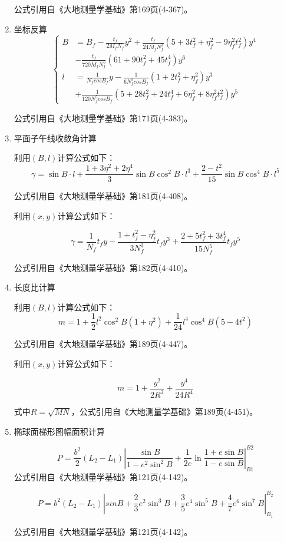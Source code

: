 \begin{enumerate}
公式引用自《大地测量学基础》第169页(4-367)。

\item 坐标反算
\[
\left \{ \begin{aligned}
B&=B_f - \frac{t_f}{2M_f N_f }y^2 +\frac{t_f}{24 M_f N_f ^3}
(5 + 3t_f ^2  + \eta_f ^2 - 9\eta_f ^2 t_f^2)y^4 \\
 &- \frac{t_f}{720 M_f N_f ^5}(61 + 90t_f ^2 + 45t_f ^4)y^6 \\
l&=\frac{1}{N_f cosB_f}y - \frac{1}{6N_f ^3 cosB_f}(1 + 2t_f ^2 + \eta_f ^2)y^3  \\
 &+ \frac{1}{120N_f ^5 cosB_f}(5 + 28t_f ^2 + 24t_f ^4 + 6\eta_f ^2 +8\eta_f ^2 t_f ^2)y^5
\end{aligned} \right.
\]

公式引用自《大地测量学基础》第171页(4-383)。


\item 平面子午线收敛角计算

利用$(B, l)$计算公式如下：
$$\gamma = \sin B \cdot l + \frac{1 + 3 \eta^2 + 2 \eta^4}{3} \sin B \cos ^2 B \cdot l^3 
+ \frac{2 - t^2}{15}\sin B \cos ^4 B \cdot l^5$$

公式引用自《大地测量学基础》第181页(4-408)。

利用$(x, y)$计算公式如下：

$$\gamma = \frac{1}{N_f}t_f y - \frac{1+t_f ^2 - \eta_f ^2}{3N_f ^3}t_f y^3 
+ \frac{2+5t_f^2+3t_f^4}{15N_f ^5}t_fy^5$$

公式引用自《大地测量学基础》第182页(4-410)。

\item 长度比计算

利用$(B, l)$计算公式如下：
$$m=1+\frac{1}{2}l^2 \cos ^2 B(1+\eta^2) + \frac{1}{24}l^4\cos ^4 B(5-4t^2)$$

公式引用自《大地测量学基础》第189页(4-447)。

利用$(x, y)$计算公式如下：

$$m=1+\frac{y^2}{2R^2} + \frac{y^4}{24R^4}$$

式中$R=\sqrt{MN}$，公式引用自《大地测量学基础》第189页(4-451)。

\item 椭球面梯形图幅面积计算

$$P = \frac{b^2}{2}(L_2 - L_1) \left | \frac{\sin B}{1-e^2\sin^2 B} + \frac{1}{2e}\ln \frac{1+e\sin B}{1-e\sin B}\right |_{B1} ^{B2} $$
公式引用自《大地测量学基础》第121页(4-142)。

$$P=b^2(L_2 - L_1)|sinB + \frac{2}{3}e^2 \sin ^3 B + \frac{3}{5}e^4 \sin^5 B + \frac{4}{7}e^6 \sin ^7 B|_{B_1} ^{B_2}$$

公式引用自《大地测量学基础》第121页(4-142)。

\end{enumerate}

